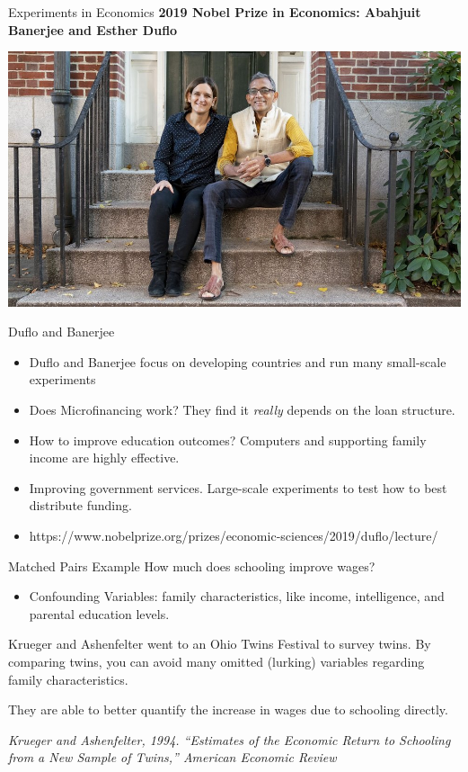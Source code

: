 \documentclass{beamer}
\begin{document}
\begin{frame}{Experiments in Economics}
	\textbf{2019 Nobel Prize in Economics: Abahjuit Banerjee and Esther Duflo}
	
	\includegraphics[width = \linewidth]{duflo_and_banerjee.jpg}
\end{frame}

\begin{frame}{Duflo and Banerjee}
	\begin{itemize}
		\item Duflo and Banerjee focus on developing countries and run many small-scale experiments 
		
		\item Does Microfinancing work? They find it \textit{really} depends on the loan structure.

		\item How to improve education outcomes? Computers and supporting family income are highly effective. 

		\item Improving government services. Large-scale experiments to test how to best distribute funding. 
		
		\item https://www.nobelprize.org/prizes/economic-sciences/2019/duflo/lecture/
	\end{itemize}
\end{frame}

\begin{frame}{Matched Pairs Example}
	How much does schooling improve wages?

	\begin{itemize}
		\item Confounding Variables: family characteristics, like income, intelligence, and parental education levels.
	\end{itemize}
	
	Krueger and Ashenfelter went to an Ohio Twins Festival to survey twins. By comparing twins, you can avoid many omitted (lurking) variables regarding family characteristics.

	They are able to better quantify the increase in wages due to schooling directly. 

	\textit{Krueger and Ashenfelter, 1994. ``Estimates of the Economic Return to Schooling from a New Sample of Twins,'' American Economic Review}
\end{frame}
\end{document}

